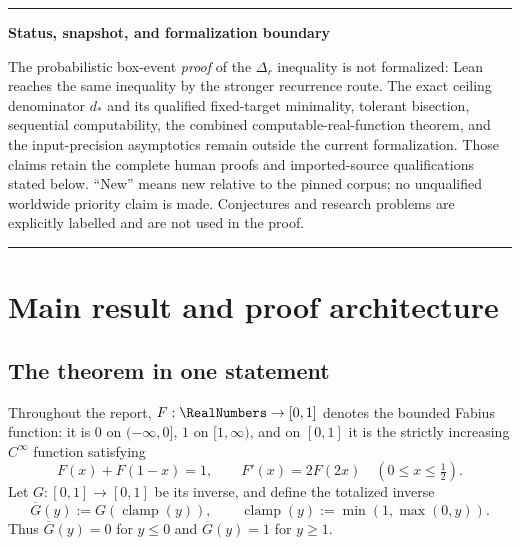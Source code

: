 \documentclass[11pt,oneside]{article}
\theoremstyle{definition}
\theoremstyle{remark}
\numberwithin{equation}{section}
\newcommand{\InvT}{\overline G}
\newcommand{\Clamp}{\operatorname{clamp}}
\newenvironment{statusbox}[1]{%
  \par\smallskip\noindent\begin{center}\begin{minipage}{0.94\textwidth}%
  \color{black}\hrule\vspace{0.55em}\small\noindent\textbf{#1}\par\smallskip
}{%
  \vspace{0.55em}\hrule\end{minipage}\end{center}\smallskip
}
\begin{document}
\begin{statusbox}{Status, snapshot, and formalization boundary}
The probabilistic box-event \emph{proof} of the $\Delta_r$ inequality is not
formalized: Lean reaches the same inequality by the stronger recurrence
route.  The exact ceiling denominator $d_*$ and its qualified fixed-target
minimality, tolerant bisection, sequential computability, the combined
computable-real-function theorem, and the input-precision asymptotics remain
outside the current formalization.  Those claims retain the complete human
proofs and imported-source qualifications stated below.  ``New'' means new
relative to the pinned corpus; no unqualified worldwide priority claim is
made.  Conjectures and research problems are explicitly labelled and are not
used in the proof.
\end{statusbox}

\tableofcontents
\clearpage

\section{Main result and proof architecture}

\subsection{The theorem in one statement}

Throughout the report, $F:\RealNumbers\to[0,1]$ denotes the bounded Fabius function:
it is $0$ on $(-\infty,0]$, $1$ on $[1,\infty)$, and on $[0,1]$ it is the
strictly increasing $C^\infty$ function satisfying
\begin{equation}\label{eq:F-basic}
 F(x)+F(1-x)=1,
 \qquad
 F'(x)=2F(2x)\quad(0\le x\le\tfrac12).
\end{equation}
Let $G:[0,1]\to[0,1]$ be its inverse, and define the totalized inverse
\begin{equation}\label{eq:totalized-inverse}
 \InvT(y):=G(\Clamp(y)),
 \qquad
 \Clamp(y):=\min(1,\max(0,y)).
\end{equation}
Thus $\InvT(y)=0$ for $y\le0$ and $\InvT(y)=1$ for $y\ge1$.
\end{document}
